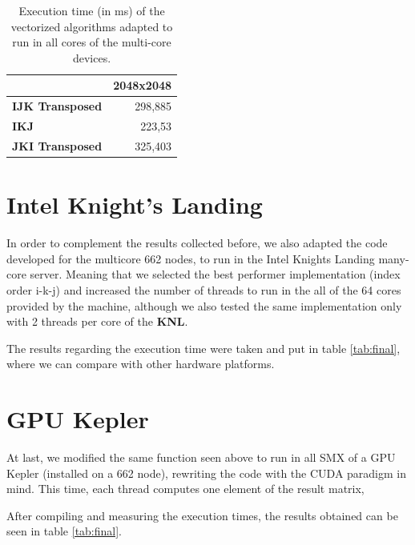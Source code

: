 \documentclass[twoside,twocolumn]{article}
\begin{document}
\begin{table}[h]
\centering
\begin{tabular}{|l|r|}
\hline
                        & \multicolumn{1}{c|}{\textbf{2048x2048}} \\ \hline
\textbf{IJK Transposed} & 298,885                                 \\ \hline
\textbf{IKJ}            & 223,53                                  \\ \hline
\textbf{JKI Transposed} & 325,403                                 \\ \hline
\end{tabular}
\caption{Execution time (in ms) of the vectorized algorithms adapted to run in all cores of the multi-core devices.}
\label{tab:omp}
\end{table}

\section{Intel Knight's Landing}

In order to complement the results collected before, we also adapted the code developed for the multicore 662 nodes, to run in the Intel Knights Landing many-core server. Meaning that we selected the best performer implementation (index order i-k-j) and increased the number of threads to run in the all of the 64 cores provided by the machine, although we also tested the same implementation only with 2 threads per core of the \textbf{KNL}.

The results regarding the execution time were taken and put in table \ref{tab:final}, where we can compare with other hardware platforms.

\section{GPU Kepler}

At last, we modified the same function seen above to run in all SMX of a GPU Kepler (installed on a 662 node), rewriting the code with the CUDA paradigm in mind. This time, each thread computes one element of the result matrix,

After compiling and measuring the execution times, the results obtained can be seen in table \ref{tab:final}.
\end{document}

